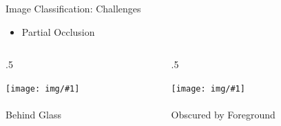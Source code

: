\documentclass{beamer}
\newcommand{\ImageAndCaptionColumn}[2]{%
    \begin{column}{.5\textwidth}
        \begin{center} 
            \texttt{[image: img/\#1]} \\~\\ 
            {\Large #2}
        \end{center} 
    \end{column}
}
\newcommand{\TextAndTwoImageFrame}[5]{%
    \vspace{-0.5cm}    
    
    \begin{itemize}
        \item #1
    \end{itemize}
    
    \vspace{-0.5cm} %
    
    \begin{columns}[T]
        \ImageAndCaptionColumn{#2}{#3}
        \ImageAndCaptionColumn{#4}{#5}
    \end{columns}
}
\begin{document}
\begin{frame}{Image Classification: Challenges}


    \TextAndTwoImageFrame{
        Partial Occlusion
    }{occl3}{Behind Glass}{occl1}{Obscured by Foreground}
    
\end{frame}
\end{document}
